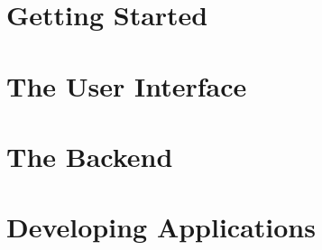 \documentclass[a4paper,10pt,twoside]{book}
\begin{document}
\frontmatter




\pagestyle{plain}

\tableofcontents
\sloppy


\mainmatter


\pagestyle{headings}

\part{Getting Started}



\part{The User Interface}


\part{The Backend}


\part{Developing Applications}






\end{document}

